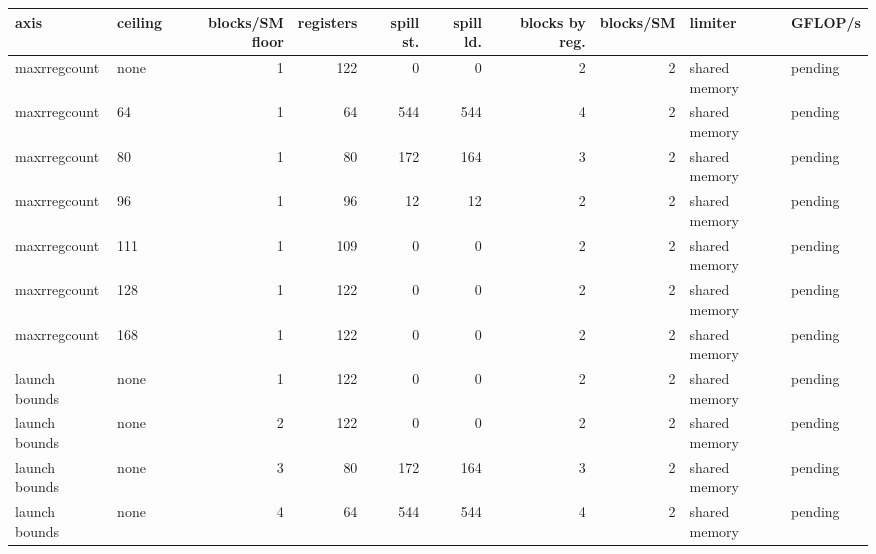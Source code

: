 \begin{tabular}{llrrrrrrll}
\toprule
axis & ceiling & blocks/SM floor & registers & spill st. & spill ld. & blocks by reg. & blocks/SM & limiter & GFLOP/s \\
\midrule
maxrregcount & none & 1 & 122 & 0 & 0 & 2 & 2 & shared memory & pending \\
maxrregcount & 64 & 1 & 64 & 544 & 544 & 4 & 2 & shared memory & pending \\
maxrregcount & 80 & 1 & 80 & 172 & 164 & 3 & 2 & shared memory & pending \\
maxrregcount & 96 & 1 & 96 & 12 & 12 & 2 & 2 & shared memory & pending \\
maxrregcount & 111 & 1 & 109 & 0 & 0 & 2 & 2 & shared memory & pending \\
maxrregcount & 128 & 1 & 122 & 0 & 0 & 2 & 2 & shared memory & pending \\
maxrregcount & 168 & 1 & 122 & 0 & 0 & 2 & 2 & shared memory & pending \\
launch bounds & none & 1 & 122 & 0 & 0 & 2 & 2 & shared memory & pending \\
launch bounds & none & 2 & 122 & 0 & 0 & 2 & 2 & shared memory & pending \\
launch bounds & none & 3 & 80 & 172 & 164 & 3 & 2 & shared memory & pending \\
launch bounds & none & 4 & 64 & 544 & 544 & 4 & 2 & shared memory & pending \\
\bottomrule
\end{tabular}
